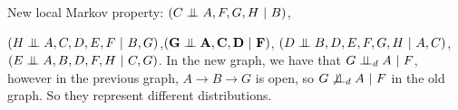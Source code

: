 New local Markov property:
$(C \mathrel{\perp\mkern-10mu\perp} A, F, G, H ~\vert~ B)$,

$(H \mathrel{\perp\mkern-10mu\perp} A, C, D, E, F ~\vert~ B, G)$,$\mathbf{(G \mathrel{\perp\mkern-10mu\perp} A, C, D ~\vert~ F)}$,
$(D \mathrel{\perp\mkern-10mu\perp} B, D, E, F, G, H ~\vert~ A, C)$, $(E \mathrel{\perp\mkern-10mu\perp} A, B, D, F, H ~\vert~ C, G)$. In the new graph, we have that $G \perp\!\!\!\perp_d A ~\vert~ F$, however in the previous graph, $A \rightarrow B \rightarrow G$ is open, so $G \not\perp\!\!\!\perp_d A ~\vert~ F$ in the old graph. So they represent different distributions.